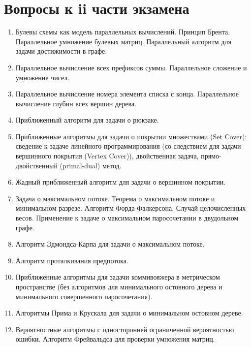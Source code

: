 \section*{Вопросы к ii части экзамена}
\begin{enumerate}[wide, labelwidth=!, labelindent=0pt]

\item Булевы схемы как модель параллельных вычислений. Принцип Брента. Параллельное умножение булевых матриц. Параллельный алгоритм для задачи достижимости в графе.

\item Параллельное вычисление всех префиксов суммы. Параллельное сложение и умножение чисел.

\item Параллельное вычисление номера элемента списка с конца. Параллельное вычисление глубин всех вершин дерева.

\item Приближенный алгоритм для задачи о рюкзаке.

\item Приближенные алгоритмы для задачи о покрытии множествами (Set Cover): сведение к задаче линейного программирования (со следствием для задачи вершинного покрытия (Vertex Cover)), двойственная задача, прямо-двойственный (primal-dual) метод.

\item Жадный приближенный алгоритм для задачи о вершинном покрытии.

\item Задача о максимальном потоке. Теорема о максимальном потоке и минимальном разрезе. Алгоритм Форда-Фалкерсона. Случай целочисленных весов. Применение к задаче о максимальном паросочетании в двудольном графе.

\item Алгоритм Эдмондса-Карпа для задачи о максимальном потоке.

\item Алгоритм проталкивания предпотока.

\item Приближённые алгоритмы для задачи коммивояжера в метрическом пространстве (без алгоритмов для минимального остовного дерева и минимального совершенного паросочетания).

\item Алгоритмы Прима и Крускала для задачи о минимальном остовном дереве.

\item Вероятностные алгоритмы с односторонней ограниченной вероятностью ошибки. Алгоритм Фрейвальдса для проверки умножения матриц.


\end{enumerate}
